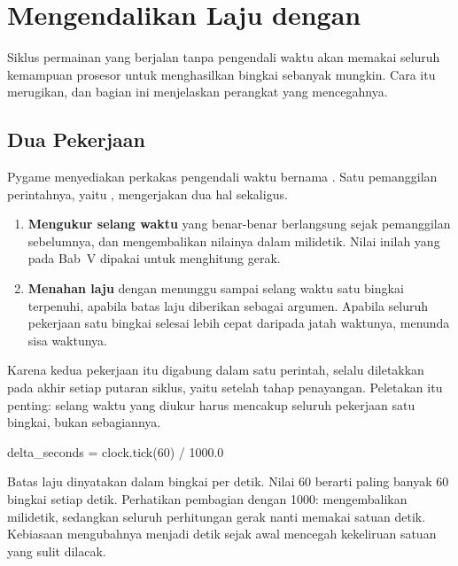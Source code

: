 \section{Mengendalikan Laju dengan }
\label{sec:mengendalikan-laju}

Siklus permainan yang berjalan tanpa pengendali waktu akan memakai seluruh
kemampuan prosesor untuk menghasilkan bingkai sebanyak mungkin. Cara itu
merugikan, dan bagian ini menjelaskan perangkat yang mencegahnya.

\subsection{Dua Pekerjaan }

Pygame menyediakan perkakas pengendali waktu bernama . Satu
pemanggilan perintahnya, yaitu , mengerjakan dua hal
sekaligus.

\begin{enumerate}
  \item \textbf{Mengukur selang waktu} yang benar-benar berlangsung sejak
        pemanggilan sebelumnya, dan mengembalikan nilainya dalam milidetik.
        Nilai inilah yang pada Bab~V dipakai untuk menghitung gerak.
  \item \textbf{Menahan laju} dengan menunggu sampai selang waktu satu bingkai
        terpenuhi, apabila batas laju diberikan sebagai argumen. Apabila
        seluruh pekerjaan satu bingkai selesai lebih cepat daripada jatah
        waktunya,  menunda sisa waktunya.
\end{enumerate}

Karena kedua pekerjaan itu digabung dalam satu perintah,  selalu
diletakkan pada akhir setiap putaran siklus, yaitu setelah tahap penayangan.
Peletakan itu penting: selang waktu yang diukur harus mencakup seluruh
pekerjaan satu bingkai, bukan sebagiannya.

\begin{kodekeluaran}
delta_seconds = clock.tick(60) / 1000.0
\end{kodekeluaran}

Batas laju dinyatakan dalam bingkai per detik. Nilai 60 berarti paling banyak
60 bingkai setiap detik. Perhatikan pembagian dengan 1000: 
mengembalikan milidetik, sedangkan seluruh perhitungan gerak nanti memakai
satuan detik. Kebiasaan mengubahnya menjadi detik sejak awal mencegah
kekeliruan satuan yang sulit dilacak.

